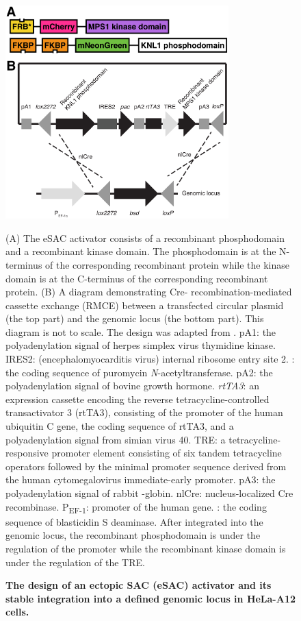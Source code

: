 \begin{figure}
    \centering
    \includegraphics[width=0.77\textwidth]{chapters/figures/eSAC+Cre-lox.pdf}
    \caption{\textbf{The design of an ectopic SAC (eSAC) activator and its stable integration into a defined genomic locus in HeLa-A12 cells.}}
    \noindent\justifying (A) The eSAC activator consists of a recombinant  phosphodomain and a recombinant  kinase domain. The phosphodomain is at the N-terminus of the corresponding recombinant protein while the kinase domain is at the C-terminus of the corresponding recombinant protein. (B) A diagram demonstrating Cre- recombination-mediated cassette exchange (RMCE) between a transfected circular plasmid (the top part) and the genomic locus (the bottom part). This diagram is not to scale. The design was adapted from \cite{HeLa-A12_Khandelia2011, HeLa-A12_Ballister2014}. pA1: the polyadenylation signal of herpes simplex virus thymidine kinase. IRES2: (encephalomyocarditis virus) internal ribosome entry site 2. : the coding sequence of puromycin \textit{N}-acetyltransferase. pA2: the polyadenylation signal of bovine growth hormone. \textit{rtTA3}: an expression cassette encoding the reverse tetracycline-controlled transactivator 3 (rtTA3), consisting of the promoter of the human ubiquitin C gene, the coding sequence of rtTA3, and a polyadenylation signal from simian virus 40. TRE: a tetracycline-responsive promoter element consisting of six tandem tetracycline operators followed by the minimal promoter sequence derived from the human cytomegalovirus immediate-early promoter. pA3: the polyadenylation signal of rabbit \textbeta{}-globin. nlCre: nucleus-localized Cre recombinase. P\textsubscript{EF-1\textalpha{}}: promoter of the human  gene. : the coding sequence of blasticidin S deaminase. After integrated into the genomic locus, the recombinant phosphodomain is under the regulation of the  promoter while the recombinant kinase domain is under the regulation of the TRE.
    \label{eSAC+Cre-lox}
\end{figure}

